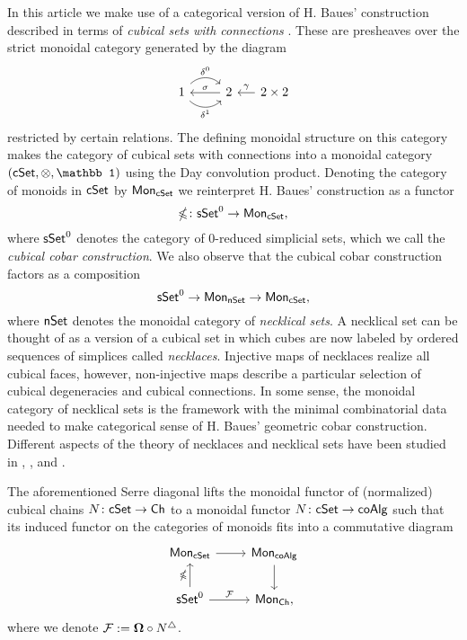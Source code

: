 In this article we make use of a categorical version of H. Baues' construction described in terms of \textit{cubical sets with connections} \cite{Brown-Higgins}. These are presheaves over the strict monoidal category generated by the diagram
\begin{equation*}
\begin{tikzcd}
1 \arrow[r, out=45, in=135, "\delta^0"] \arrow[r, out=-45, in=-135, "\delta^1"'] & 2 \arrow[l, "\sigma"'] &[-10pt] \arrow[l, "\gamma"'] 2 \times 2
\end{tikzcd}
\end{equation*}
restricted by certain relations.
The defining monoidal structure on this category makes the category of cubical sets with connections into a monoidal category $(\cSet, \otimes, \mathbb 1)$ using the Day convolution product.
Denoting the category of monoids in $\mathsf{cSet}$ by $\mathsf{Mon}_{\mathsf{cSet}}$ we reinterpret H. Baues' construction as a functor
$$\mathbb{\Omega} \colon \mathsf{sSet}^0 \to \mathsf{Mon}_{\mathsf{cSet}},$$
where $\mathsf{sSet}^0$ denotes the category of $0$-reduced simplicial sets, which we call the \textit{cubical cobar construction}. We also observe that the cubical cobar construction factors as a composition
$$\mathsf{sSet}^0 \to \mathsf{Mon}_{\mathsf{nSet}} \to \mathsf{Mon}_{\mathsf{cSet}},
$$
where $\mathsf{nSet}$ denotes the monoidal category of \textit{necklical sets}. A necklical set can be thought of as a version of a cubical set in which cubes are now labeled by ordered sequences of simplices called \textit{necklaces}. Injective maps of necklaces realize all cubical faces, however, non-injective maps describe a particular selection of cubical degeneracies and cubical connections. In some sense, the monoidal category of necklical sets is the framework with the minimal combinatorial data needed to make categorical sense of H. Baues' geometric cobar construction. Different aspects of the theory of necklaces and necklical sets have been studied in \cite{Dugger-Spivak}, \cite{Galvez-Kaufmann-Tonks}, and \cite{rivera-zeinalian-cubical}.

The aforementioned Serre diagonal lifts the monoidal functor of (normalized) cubical chains $N \colon \mathsf{cSet} \to \mathsf{Ch}$ to a monoidal functor $N \colon \mathsf{cSet} \to \mathsf{coAlg}$ such that its induced functor on the categories of monoids fits into a commutative diagram
\begin{equation*}
\begin{tikzcd}
\Mon_{\cSet} \arrow[r] & \Mon_{\coAlg} \arrow[d] \\
\sSet^0 \arrow[r, "\mathcal{F}"] \arrow[u, "\gcobar"] & \Mon_{\Ch},
\end{tikzcd}
\end{equation*}
where we denote $\mathcal{F}:=\mathbf{\Omega} \circ N^{\triangle}$.

